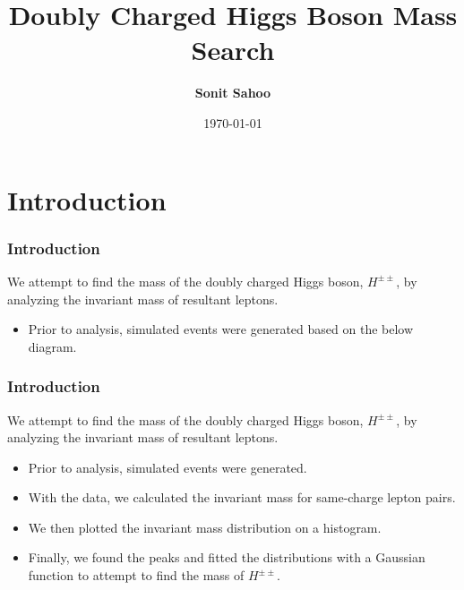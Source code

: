 \documentclass{beamer}
\title{Doubly Charged Higgs Boson Mass Search}
\author{\textbf{Sonit Sahoo}}
\date{\today}
\begin{document}
\frame{\titlepage}

\section{Introduction}
\begin{frame}
\frametitle{Introduction}
We attempt to find the mass of the doubly charged Higgs boson, $H^{\pm\pm}$, by analyzing the invariant mass of resultant leptons.\\

\begin{itemize}
    \item<2> Prior to analysis, simulated events were generated based on the below diagram. \begin{center}
    \end{center}
\end{itemize}
\end{frame}

\begin{frame}
\frametitle{Introduction}
We attempt to find the mass of the doubly charged Higgs boson, $H^{\pm\pm}$, by analyzing the invariant mass of resultant leptons.\\

\begin{itemize}
    \item<1-> Prior to analysis, simulated events were generated.
    \item<1-> With the data, we calculated the invariant mass for same-charge lepton pairs.
    \item<2-> We then plotted the invariant mass distribution on a histogram.
    \item<3-> Finally, we found the peaks and fitted the distributions with a Gaussian function to attempt to find the mass of $H^{\pm\pm}$.
\end{itemize}
\end{frame}
\end{document}
